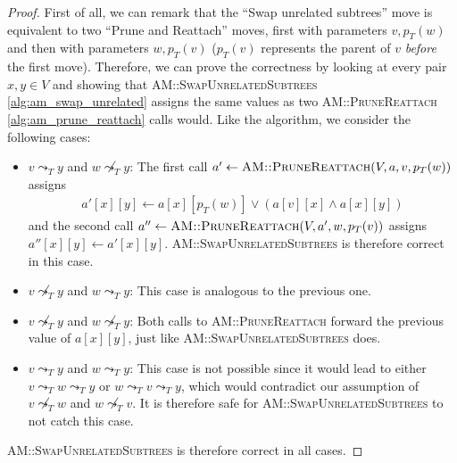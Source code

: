 \begin{proof}
    First of all, we can remark that the ``Swap unrelated subtrees'' move is equivalent to two ``Prune and Reattach'' moves, first with parameters $v, p_T(w)$ and then with parameters $w, p_T(v)$ ($p_T(v)$ represents the parent of $v$ \textit{before} the first move). Therefore, we can prove the correctness by looking at every pair $x,y \in V$ and showing that \textsc{AM::SwapUnrelatedSubtrees} \ref{alg:am_swap_unrelated} assigns the same values as two \textsc{AM::PruneReattach} \ref{alg:am_prune_reattach} calls would. Like the algorithm, we consider the following cases:
    \begin{itemize}
        \item $v \leadsto_T y$ and $w \not\leadsto_T y$: The first call $a' \leftarrow \textsc{AM::PruneReattach}(V, a, v, p_T(w))$ assigns 
        \begin{align*}
            a'[x][y] \leftarrow a[x][p_T(w)] \vee (a[v][x] \wedge a[x][y])
        \end{align*}
        and the second call $a'' \leftarrow \textsc{AM::PruneReattach}(V, a', w, p_T(v))$ assigns $a''[x][y] \leftarrow a'[x][y]$. \textsc{AM::SwapUnrelatedSubtrees} is therefore correct in this case.
        \item $v \not\leadsto_T y$ and $w \leadsto_T y$: This case is analogous to the previous one.
        \item $v \not\leadsto_T y$ and $w \not\leadsto_T y$: Both calls to \textsc{AM::PruneReattach} forward the previous value of $a[x][y]$, just like \textsc{AM::SwapUnrelatedSubtrees} does.
        \item $v \leadsto_T y$ and $w \leadsto_T y$: This case is not possible since it would lead to either $v \leadsto_T w \leadsto_T y$ or $w \leadsto_T v \leadsto_T y$, which would contradict our assumption of $v \not\leadsto_T w$ and $w \not\leadsto_T v$. It is therefore safe for \textsc{AM::SwapUnrelatedSubtrees} to not catch this case.
    \end{itemize}
    \textsc{AM::SwapUnrelatedSubtrees} is therefore correct in all cases.
\end{proof}

